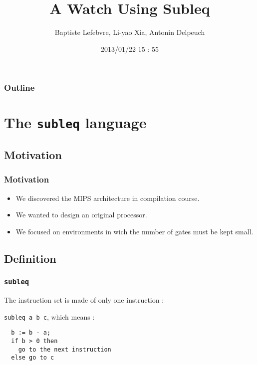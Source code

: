 \documentclass[slidestop]{beamer}
\begin{document}
\makeatletter

\title{A Watch Using Subleq}
\author{Baptiste Lefebvre, Li-yao Xia, Antonin Delpeuch}
\date{2013/01/22 15 : 55}

\begin{frame}
    \maketitle
\end{frame}

\begin{frame}
    \frametitle{Outline}
    \tableofcontents
\end{frame}
\section{The \texttt{subleq} language}
\subsection{Motivation}

\begin{frame}
    \frametitle{Motivation}

    \begin{itemize}
        \item We discovered the MIPS architecture in compilation course.
        \item We wanted to design an original processor.
        \item We focused on environments in wich the number of gates must be kept small.
    \end{itemize}

\end{frame}

\subsection{Definition}
\begin{frame}[fragile]
    \frametitle{\texttt{subleq}}

    The instruction set is made of only one instruction :

    \texttt{subleq a b c}, which means :

\begin{lstlisting}
  b := b - a;
  if b > 0 then
    go to the next instruction
  else go to c
\end{lstlisting}

\end{frame}
\end{document}
